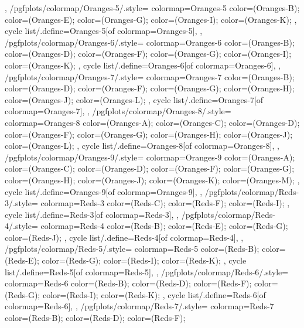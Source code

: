{{  },
  /pgfplots/colormap/Oranges-5/.style={
    colormap={Oranges-5}{
      color=(Oranges-B);
      color=(Oranges-E);
      color=(Oranges-G);
      color=(Oranges-I);
      color=(Oranges-K);
    },
    cycle list/.define={Oranges-5}{[of colormap=Oranges-5]},
  },
  /pgfplots/colormap/Oranges-6/.style={
    colormap={Oranges-6}{
      color=(Oranges-B);
      color=(Oranges-D);
      color=(Oranges-F);
      color=(Oranges-G);
      color=(Oranges-I);
      color=(Oranges-K);
    },
    cycle list/.define={Oranges-6}{[of colormap=Oranges-6]},
  },
  /pgfplots/colormap/Oranges-7/.style={
    colormap={Oranges-7}{
      color=(Oranges-B);
      color=(Oranges-D);
      color=(Oranges-F);
      color=(Oranges-G);
      color=(Oranges-H);
      color=(Oranges-J);
      color=(Oranges-L);
    },
    cycle list/.define={Oranges-7}{[of colormap=Oranges-7]},
  },
  /pgfplots/colormap/Oranges-8/.style={
    colormap={Oranges-8}{
      color=(Oranges-A);
      color=(Oranges-C);
      color=(Oranges-D);
      color=(Oranges-F);
      color=(Oranges-G);
      color=(Oranges-H);
      color=(Oranges-J);
      color=(Oranges-L);
    },
    cycle list/.define={Oranges-8}{[of colormap=Oranges-8]},
  },
  /pgfplots/colormap/Oranges-9/.style={
    colormap={Oranges-9}{
      color=(Oranges-A);
      color=(Oranges-C);
      color=(Oranges-D);
      color=(Oranges-F);
      color=(Oranges-G);
      color=(Oranges-H);
      color=(Oranges-J);
      color=(Oranges-K);
      color=(Oranges-M);
    },
    cycle list/.define={Oranges-9}{[of colormap=Oranges-9]},
  },
  /pgfplots/colormap/Reds-3/.style={
    colormap={Reds-3}{
      color=(Reds-C);
      color=(Reds-F);
      color=(Reds-I);
    },
    cycle list/.define={Reds-3}{[of colormap=Reds-3]},
  },
  /pgfplots/colormap/Reds-4/.style={
    colormap={Reds-4}{
      color=(Reds-B);
      color=(Reds-E);
      color=(Reds-G);
      color=(Reds-J);
    },
    cycle list/.define={Reds-4}{[of colormap=Reds-4]},
  },
  /pgfplots/colormap/Reds-5/.style={
    colormap={Reds-5}{
      color=(Reds-B);
      color=(Reds-E);
      color=(Reds-G);
      color=(Reds-I);
      color=(Reds-K);
    },
    cycle list/.define={Reds-5}{[of colormap=Reds-5]},
  },
  /pgfplots/colormap/Reds-6/.style={
    colormap={Reds-6}{
      color=(Reds-B);
      color=(Reds-D);
      color=(Reds-F);
      color=(Reds-G);
      color=(Reds-I);
      color=(Reds-K);
    },
    cycle list/.define={Reds-6}{[of colormap=Reds-6]},
  },
  /pgfplots/colormap/Reds-7/.style={
    colormap={Reds-7}{
      color=(Reds-B);
      color=(Reds-D);
      color=(Reds-F);
}}}
